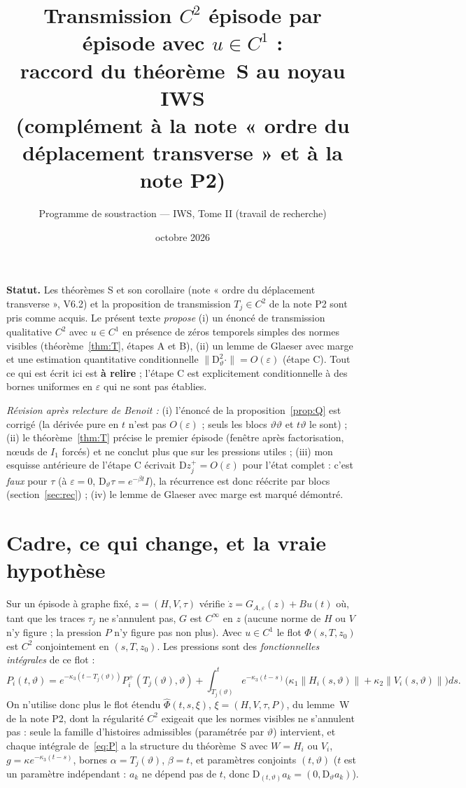 \documentclass[11pt,a4paper]{article}
\title{Transmission $C^2$ épisode par épisode avec $u\in C^1$ :\\ raccord du théorème~S au noyau IWS\\[2pt]
\large (complément à la note « ordre du déplacement transverse » et à la note P2)}
\author{Programme de soustraction --- IWS, Tome II (travail de recherche)}
\date{octobre 2026}
\theoremstyle{remark}
\newcommand{\vth}{\vartheta}
\newcommand{\D}{\mathrm D}
\begin{document}
\maketitle

\noindent\textbf{Statut.} Les théorèmes S et son corollaire (note « ordre du déplacement transverse », V6.2) et la proposition de transmission $T_j\in C^2$ de la note P2 sont pris comme acquis. Le présent texte \emph{propose} (i) un énoncé de transmission qualitative $C^2$ avec $u\in C^1$ en présence de zéros temporels simples des normes visibles (théorème~\ref{thm:T}, étapes A et B), (ii) un lemme de Glaeser avec marge et une estimation quantitative conditionnelle $\lVert\D^2_\vth\cdot\rVert=O(\varepsilon)$ (étape C). Tout ce qui est écrit ici est \textbf{à relire} ; l'étape C est explicitement conditionnelle à des bornes uniformes en $\varepsilon$ qui ne sont pas établies.

\emph{Révision après relecture de Benoit :} (i) l'énoncé de la proposition~\ref{prop:Q} est corrigé (la dérivée pure en $t$ n'est pas $O(\varepsilon)$ ; seuls les blocs $\vth\vth$ et $t\vth$ le sont) ; (ii) le théorème~\ref{thm:T} précise le premier épisode (fenêtre après factorisation, nœuds de $I_1$ forcés) et ne conclut plus que sur les pressions utiles ; (iii) mon esquisse antérieure de l'étape C écrivait $\D z_j^+=O(\varepsilon)$ pour l'état complet : c'est \emph{faux} pour $\tau$ (à $\varepsilon=0$, $\D_\vth\tau=e^{-\beta t}I$), la récurrence est donc réécrite par blocs (section~\ref{sec:rec}) ; (iv) le lemme de Glaeser avec marge est marqué démontré.

\section{Cadre, ce qui change, et la vraie hypothèse}\label{sec:cadre}
Sur un épisode à graphe fixé, $z=(H,V,\tau)$ vérifie $\dot z=G_{A,\varepsilon}(z)+Bu(t)$ où, tant que les traces $\tau_j$ ne s'annulent pas, $G$ est $C^\infty$ en $z$ (aucune norme de $H$ ou $V$ n'y figure ; la pression $P$ n'y figure pas non plus). Avec $u\in C^1$ le flot $\Phi(s,T,z_0)$ est $C^2$ conjointement en $(s,T,z_0)$. Les pressions sont des \emph{fonctionnelles intégrales} de ce flot :
\begin{equation}\label{eq:P}
P_i(t,\vth)=e^{-\kappa_3(t-T_{j}(\vth))}P_i^+(T_j(\vth),\vth)+\int_{T_{j}(\vth)}^{t}e^{-\kappa_3(t-s)}\bigl(\kappa_1\lVert H_i(s,\vth)\rVert+\kappa_2\lVert V_i(s,\vth)\rVert\bigr)ds .
\end{equation}
On n'utilise donc plus le flot étendu $\widehat\Phi(t,s,\xi)$, $\xi=(H,V,\tau,P)$, du lemme~W de la note P2, dont la régularité $C^2$ exigeait que les normes visibles ne s'annulent pas : seule la famille d'histoires admissibles (paramétrée par $\vth$) intervient, et chaque intégrale de~\eqref{eq:P} a la structure du théorème~S avec $W=H_i$ ou $V_i$, $g=\kappa e^{-\kappa_3(t-s)}$, bornes $\alpha=T_j(\vth)$, $\beta=t$, et paramètres conjoints $(t,\vth)$ ($t$ est un paramètre indépendant : $a_k$ ne dépend pas de $t$, donc $\D_{(t,\vth)}a_k=(0,\D_\vth a_k)$).
\end{document}
